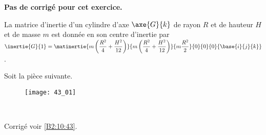 \normaltrue \difficilefalse \tdifficilefalse
\correctionfalse


\setcounter{numques}{0}
\ifcorrection
\else
\textbf{Pas de corrigé pour cet exercice.}
\fi




\ifprof
\else
La matrice d'inertie d'un cylindre d'axe $\axe{G}{k}$ de rayon $R$ et de hauteur $H$ et de masse $m$ est donnée en son centre d'inertie par 
$\inertie{G}{1}=\matinertie{m\left(\dfrac{R^2}{4}+\dfrac{H^2}{12} \right)}{m\left(\dfrac{R^2}{4}+\dfrac{H^2}{12} \right)}{m\dfrac{R^2}{2}}{0}{0}{0}{\base{i}{j}{k}}$.

Soit la pièce suivante. 
\begin{figure}[H]
\centering
\texttt{[image: 43\_01]}
\end{figure}
\fi


\ifprof
\else
\fi

\ifprof ~\\
\else
\fi


\ifprof
\else
\begin{flushright}
\footnotesize{Corrigé voir \ref{B2:10:43}.}
\end{flushright}%
\fi